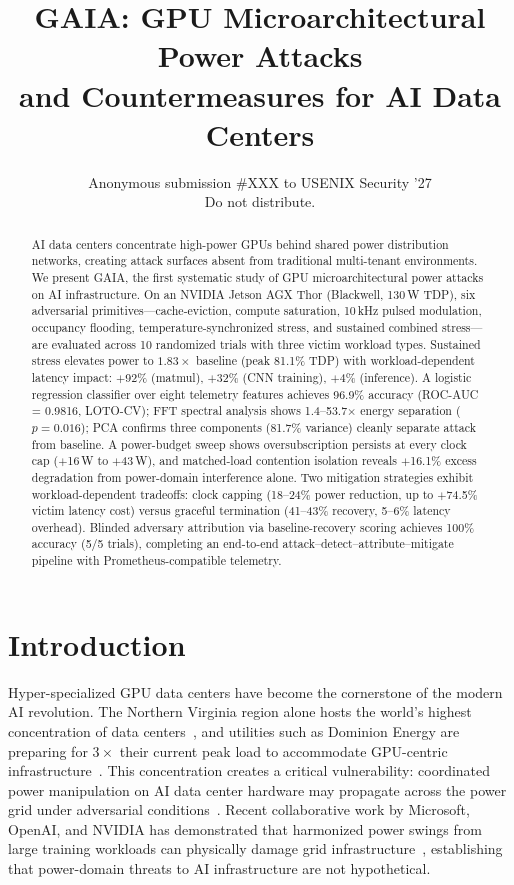 \documentclass[letterpaper,twocolumn,10pt]{article}
\date{}
\title{\Large \bf GAIA: GPU Microarchitectural Power Attacks\\and Countermeasures for AI Data Centers}
\author{{\rm Anonymous submission \#XXX to USENIX Security '27}\\
Do not distribute.}
\begin{document}
\maketitle

\begin{abstract}
AI data centers concentrate high-power GPUs behind shared power
distribution networks, creating attack surfaces absent from
traditional multi-tenant environments.
We present GAIA, the first systematic study of GPU
microarchitectural power attacks on AI infrastructure.
On an NVIDIA Jetson AGX Thor (Blackwell, 130\,W TDP), six
adversarial primitives---cache-eviction, compute saturation,
10\,kHz pulsed modulation, occupancy flooding,
temperature-synchronized stress, and sustained combined
stress---are evaluated across 10 randomized trials with three
victim workload types.
Sustained stress elevates power to $1.83\times$ baseline (peak
81.1\% TDP) with workload-dependent latency impact:
$+$92\% (matmul), $+$32\% (CNN training), $+$4\% (inference).
A logistic regression classifier over eight telemetry features
achieves 96.9\% accuracy (ROC-AUC = 0.9816, LOTO-CV); FFT
spectral analysis shows 1.4--53.7$\times$ energy separation
($p{=}0.016$); PCA confirms three components (81.7\% variance)
cleanly separate attack from baseline.
A power-budget sweep shows oversubscription persists at every
clock cap ($+$16\,W to $+$43\,W), and matched-load contention
isolation reveals $+$16.1\% excess degradation from power-domain
interference alone.
Two mitigation strategies exhibit workload-dependent tradeoffs:
clock capping (18--24\% power reduction, up to $+$74.5\% victim
latency cost) versus graceful termination (41--43\% recovery,
5--6\% latency overhead).  Blinded adversary attribution via
baseline-recovery scoring achieves 100\% accuracy (5/5 trials),
completing an end-to-end attack--detect--attribute--mitigate pipeline
with Prometheus-compatible telemetry.
\end{abstract}

\section{Introduction}
\label{sec:intro}

Hyper-specialized GPU data centers have become the cornerstone of the
modern AI revolution.  The Northern Virginia region alone hosts the
world's highest concentration of data centers~\cite{eia2026}, and
utilities such as Dominion Energy are preparing for $3\times$ their
current peak load to accommodate GPU-centric
infrastructure~\cite{jlarc2024,dominion2026}.  This concentration creates a
critical vulnerability: coordinated power manipulation on AI data
center hardware may propagate across the power grid under adversarial
conditions~\cite{choukse2025}.  Recent collaborative work by
Microsoft, OpenAI, and NVIDIA has demonstrated that harmonized power
swings from large training workloads can physically damage grid
infrastructure~\cite{watchus2025,semieng2025}, establishing that
power-domain threats to AI infrastructure are not hypothetical.
\end{document}
